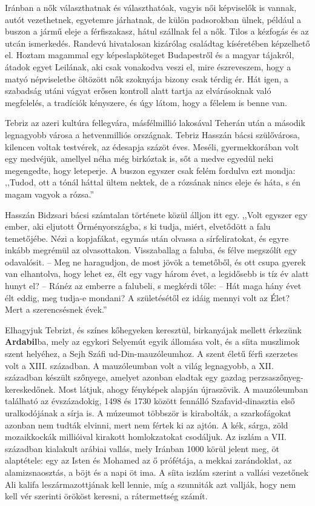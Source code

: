 Iránban a nők választhatnak és választhatóak, vagyis női képviselők
is vannak, autót vezethetnek, egyetemre járhatnak, de külön padsorokban
ülnek, például a buszon a jármű eleje a férfiszakasz, hátul
szállnak fel a nők. Tilos a kézfogás és az utcán ismerkedés. Randevú
hivatalosan kizárólag családtag kíséretében képzelhető el. Hoztam
magammal egy képeslapköteget Budapestről és a magyar tájakról, átadok
egyet Leilának, aki csak vonakodva veszi el, mire észreveszem,
hogy a matyó népviseletbe öltözött nők szoknyája bizony csak térdig
ér. Hát igen, a szabadság utáni vágyat erősen kontroll alatt tartja az
elvárásoknak való megfelelés, a tradíciók kényszere, és úgy látom, hogy
a félelem is benne van.

Tebriz az azeri kultúra fellegvára, másfélmillió lakosával Teherán
után a második legnagyobb városa a hetvenmilliós országnak. Tebriz
Hasszán bácsi szülővárosa, kilencen voltak testvérek, az édesapja
százöt éves. Meséli, gyermekkorában volt egy medvéjük, amellyel
néha még birkóztak is, sőt a medve egyedül neki megengedte, hogy
leteperje. A buszon egyszer csak felém fordulva ezt mondja: ,,Tudod,
ott a tónál háttal ültem nektek, de a rózsának nincs eleje és háta, s én
magam vagyok a rózsa.''

Hasszán Bidzsari bácsi számtalan története közül álljon itt egy.
,,Volt egyszer egy ember, aki eljutott Örményországba, s ki tudja,
miért, elvetődött a falu temetőjébe. Nézi a kopjafákat, egymás után
olvassa a sírfeliratokat, és egyre inkább megrémül az olvasottakon.
Visszaballag a faluba, és félve megszólít egy odavalósit. -- Meg ne
haragudjon, de most jövök a temetőből, és ott csupa gyerek van elhantolva,
hogy lehet ez, élt egy vagy három évet, a legidősebb is tíz év alatt hunyt
el? -- Ránéz az emberre a falubeli, s megkérdi tőle: -- Hát maga hány
évet élt eddig, meg tudja-e mondani? A születésétől ez idáig mennyi
volt az Élet? Mert a szerencsésnek évek.''

Elhagyjuk Tebrizt, és színes kőhegyeken keresztül, birkanyájak
mellett érkezünk \textbf{Ardabil}ba, mely az egykori Selyemút egyik állomása
volt, és a síita muszlimok szent helyéhez, a Sejh Száfi ud-Din-mauzóleumhoz.
A szent életű férfi szerzetes volt a XIII. században. A mauzóleumban
volt a világ legnagyobb, a XII. században készült szőnyege,
amelyet azonban eladtak egy gazdag perzsaszőnyeg-kereskedőnek.
Most látjuk, ahogy fényképek alapján újraszövik. A mauzóleumban
található az évszázadokig, 1498 és 1730 között fennálló Szafavid-dinasztia
első uralkodójának a sírja is. A múzeumot többször is kirabolták,
a szarkofágokat azonban nem tudták elvinni, mert nem fértek
ki az ajtón. A kék, sárga, zöld mozaikkockák millióival kirakott
homlokzatokat csodáljuk. Az iszlám a VII. században kialakult arábiai
vallás, mely Iránban 1000 körül jelent meg, öt alaptétele: egy az Isten
és Mohamed az ő prófétája, a mekkai zarándoklat, az alamizsnaosztás,
a böjt és a napi öt ima. A síita iszlám szerint a vallási vezetőnek Ali
kalifa leszármazottjának kell lennie, míg a szunniták azt vallják, hogy
nem kell vér szerinti örököst keresni, a rátermettség számít.


